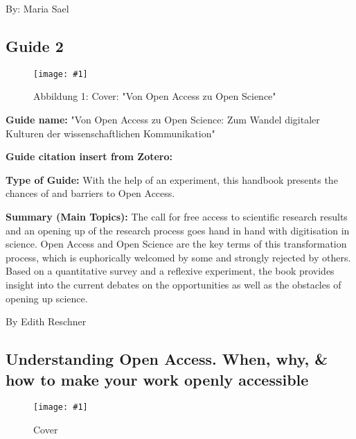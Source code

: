 \documentclass{article}
\newlength{\imgwidth}
\newcommand\scaledgraphics[2]{%
                
\settowidth{\imgwidth}{\texttt{[image: \#1]}}%
                
\setlength{\imgwidth}{\minof{\imgwidth}{#2\textwidth}}%
                
\texttt{[image: \#1]}%
                
}
\begin{document}
By: Maria Sael 


\subsection{Guide 2}\label{H9740541}



\begin{center}
\begin{figure}
\scaledgraphics{499c4719-8346-4a67-8a5b-fcacfb0ecde0.png}{0.5}
\caption*{Abbildung 1: Cover: "Von Open Access zu Open Science"}\label{F14991031}
\end{figure}


\end{center}





\textbf{Guide name:} "Von Open Access zu Open Science: Zum Wandel digitaler Kulturen der wissenschaftlichen Kommunikation"


\textbf{Guide citation insert from Zotero:}  \autocite{heise_von_2018}


\textbf{Type of Guide: }With the help of an experiment, this handbook presents the chances of and barriers to Open Access.


\textbf{Summary (Main Topics): }The call for free access to scientific research results and an opening up of the research process goes hand in hand with digitisation in science. Open Access and Open Science are the key terms of this transformation process, which is euphorically welcomed by some and strongly rejected by others. Based on a quantitative survey and a reflexive experiment, the book provides insight into the current debates on the opportunities as well as the obstacles of opening up science.


By Edith Reschner 


\subsection{Understanding Open Access. When, why, \& how to make your work openly accessible}\label{H1144211}


\begin{figure}
\scaledgraphics{37cc2dfd-e350-4e29-acc3-9c7f815eb133.png}{0.5}
\caption*{Cover}\label{F36070241}
\end{figure}
\end{document}
